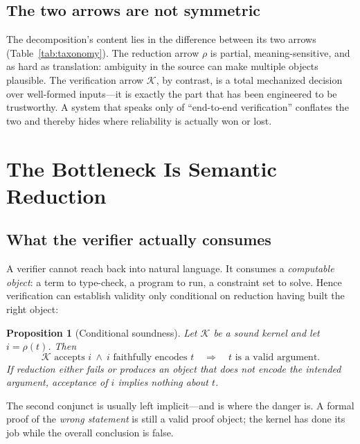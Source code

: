 \documentclass[11pt,a4paper]{article}
\newcommand{\kernel}{\mathcal{K}}
\newcommand{\reducemap}{\rho}
\theoremstyle{plain}
\newtheorem{proposition}{Proposition}
\theoremstyle{definition}
\theoremstyle{remark}
\begin{document}
\subsection{The two arrows are not symmetric}
The decomposition's content lies in the difference between its two arrows
(Table~\ref{tab:taxonomy}). The reduction arrow $\reducemap$ is partial,
meaning-sensitive, and as hard as translation: ambiguity in the source can
make multiple objects plausible. The verification arrow $\kernel$, by
contrast, is a total mechanized decision over well-formed inputs---it is
exactly the part that has been engineered to be trustworthy. A system that
speaks only of ``end-to-end verification'' conflates the two and thereby
hides where reliability is actually won or lost.

\section{The Bottleneck Is Semantic Reduction}\label{sec:bottleneck}

\subsection{What the verifier actually consumes}
A verifier cannot reach back into natural language. It consumes a
\emph{computable object}: a term to type-check, a program to run, a
constraint set to solve. Hence verification can establish validity only
conditional on reduction having built the right object:
\begin{proposition}[Conditional soundness]\label{prop:conditional}
Let $\kernel$ be a sound kernel and let $i=\reducemap(t)$. Then
\begin{equation}
\kernel\text{ accepts } i \ \wedge\ i\text{ faithfully encodes }t
\quad\Longrightarrow\quad t\text{ is a valid argument.}
\end{equation}
If reduction either fails or produces an object that does not encode the
intended argument, acceptance of $i$ implies nothing about $t$.
\end{proposition}
The second conjunct is usually left implicit---and is where the danger is.
A formal proof of the \emph{wrong statement} is still a valid proof
object; the kernel has done its job while the overall conclusion is false.
\end{document}
